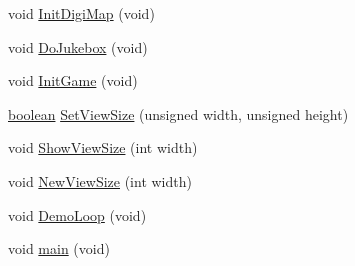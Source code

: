\begin{DoxyCompactItemize}
\item 
void \hyperlink{WL__MAIN_8C_a0c38b7da578246b8d7c8c350af1ecdb1}{InitDigiMap} (void)
\item 
void \hyperlink{WL__MAIN_8C_aeff0948270bdff815c7b30e558e7129b}{DoJukebox} (void)
\item 
void \hyperlink{WL__MAIN_8C_ad05ce539d29b849ef066482e2284a93f}{InitGame} (void)
\item 
\hyperlink{ID__HEAD_8H_a7c6368b321bd9acd0149b030bb8275ed}{boolean} \hyperlink{WL__MAIN_8C_af74ea12ed1f33b5eb32cee5062ea034c}{SetViewSize} (unsigned width, unsigned height)
\item 
void \hyperlink{WL__MAIN_8C_aa3aa2bb8e2e2e33f4c843747fd68c9c5}{ShowViewSize} (int width)
\item 
void \hyperlink{WL__MAIN_8C_accba26d21c8d31a42729fd0039d5c8e8}{NewViewSize} (int width)
\item 
void \hyperlink{WL__MAIN_8C_aee1eb6a4b164d3763069996adb02f1b5}{DemoLoop} (void)
\item 
void \hyperlink{WL__MAIN_8C_a6288eba0f8e8ad3ab1544ad731eb7667}{main} (void)
\end{DoxyCompactItemize}
